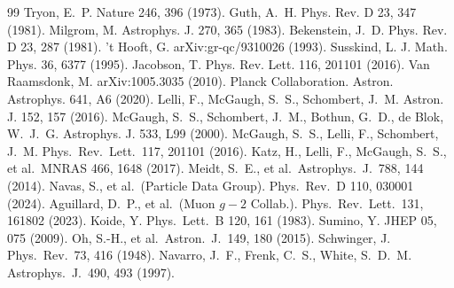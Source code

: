 \documentclass[twocolumn]{aastex631}
\begin{document}
\begin{thebibliography}{99}
 Tryon, E.~P. Nature 246, 396 (1973).
 Guth, A.~H. Phys. Rev. D 23, 347 (1981).
 Milgrom, M. Astrophys. J. 270, 365 (1983).
 Bekenstein, J.~D. Phys. Rev. D 23, 287 (1981).
 't Hooft, G. arXiv:gr-qc/9310026 (1993).
 Susskind, L. J. Math. Phys. 36, 6377 (1995).
 Jacobson, T. Phys. Rev. Lett. 116, 201101 (2016).
 Van Raamsdonk, M. arXiv:1005.3035 (2010).
 Planck Collaboration. Astron. Astrophys. 641, A6 (2020).
 Lelli, F., McGaugh, S.~S., Schombert, J.~M. Astron. J. 152, 157 (2016).
 McGaugh, S.~S., Schombert, J.~M., Bothun, G.~D., de Blok, W.~J.~G. Astrophys. J. 533, L99 (2000).
 McGaugh, S.~S., Lelli, F., Schombert, J.~M. Phys.\ Rev.\ Lett.\ 117, 201101 (2016).
 Katz, H., Lelli, F., McGaugh, S.~S., et al.\ MNRAS 466, 1648 (2017).
 Meidt, S.~E., et al.\ Astrophys.\ J.\ 788, 144 (2014).
 Navas, S., et al.\ (Particle Data Group). Phys.\ Rev.\ D 110, 030001 (2024).
 Aguillard, D.~P., et al.\ (Muon $g-2$ Collab.). Phys.\ Rev.\ Lett.\ 131, 161802 (2023).
 Koide, Y. Phys.\ Lett.\ B 120, 161 (1983).
 Sumino, Y. JHEP 05, 075 (2009).
 Oh, S.-H., et al.\ Astron.\ J.\ 149, 180 (2015).
 Schwinger, J. Phys.\ Rev.\ 73, 416 (1948).
 Navarro, J.~F., Frenk, C.~S., White, S.~D.~M. Astrophys.\ J.\ 490, 493 (1997).
\end{thebibliography}
\end{document}
